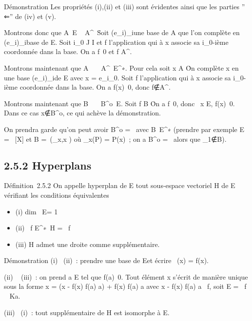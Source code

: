 \documentclass[]{article}
\begin{document}
Démonstration Les propriétés (i),(ii) et (iii) sont évidentes ainsi que
les parties '' ⇐'' de (iv) et (v).

Montrons donc que A\neq~E \rigtharrow~
A^\bot\neq~\0\.
Soit (e_i)_i\inI une base de A que l'on complète en
(e_i)_i\inJ base de E. Soit i_0 \in J \diagdown I et f
l'application qui à x associe sa i_0-ième coordonnée dans la
base. On a f\neq~0 et f \in A^\bot.

Montrons maintenant que
A\neq~\0\ \rigtharrow~
A^\bot\neq~E^∗. Pour cela soit
x \in A \diagdown\0\. On complète x en une base
(e_i)_i\inI de E avec x = e_i_0. Soit
f l'application qui à x associe sa i_0-ième coordonnée dans la
base. On a f(x)\neq~0, donc
f∉A^\bot.

Montrons maintenant que
B\neq~\0\ \rigtharrow~
B^o\neq~E. Soit f \in B
\diagdown\0\. On a
f\neq~0, donc \exists~x \in E,
f(x)\neq~0. Dans ce cas
x∉B^o, ce qui achève la
démonstration.

On prendra garde qu'on peut avoir B^o =
\0\ avec
B\neq~E^∗ (prendre par exemple E =
~[X] et B =\
\mathrmVect(\epsilon_x,x \in {}) où \epsilon_x(P)
= P(x)~; on a B^o = \0\
alors que \epsilon_1∉B).

\subsection{2.5.2 Hyperplans}

Définition~2.5.2 On appelle hyperplan de E tout sous-espace vectoriel H
de E vérifiant les conditions équivalentes

\begin{itemize}
\itemsep1pt\parskip0pt
\item
  (i) dim~ E\diagupH = 1
\item
  (ii) \exists~f \in
  E^∗\diagdown\0\, H
  = \mathrmKer~f
\item
  (iii) H admet une droite comme supplémentaire.
\end{itemize}

Démonstration (i) \rigtharrow~(ii)~: prendre \overlinee une base
de E\diagupH et écrire \pi~(x) = f(x)\overlinee.

(ii) \rigtharrow~ (iii)~: on prend a \in E tel que f(a)\neq~0.
Tout élément x s'écrit de manière unique sous la forme x = (x - f(x)
\over f(a) a) + f(x) \over f(a) a
avec x - f(x) \over f(a) a
\in\mathrmKer~f, soit E
= \mathrmKer~f \oplus~ Ka.

(iii) \rigtharrow~(i)~: tout supplémentaire de H est isomorphe à E\diagupH.
\end{document}
